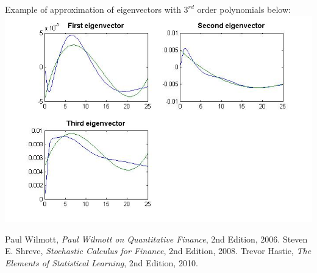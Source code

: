\documentclass[11pt]{article} %
\begin{document}
Example of approximation of eigenvectors with $3^{rd}$ order polynomials below:\\
\includegraphics[scale=0.6]{fitting.jpg}\\

\begin{thebibliography}{9}
 Paul Wilmott, \emph{Paul Wilmott on Quantitative Finance}, 2nd Edition, 2006.
 Steven E. Shreve, \emph{Stochastic Calculus for Finance}, 2nd Edition, 2008.
 Trevor Hastie, \emph{The Elements of Statistical Learning}, 2nd Edition, 2010.
\end{thebibliography}
\end{document}
